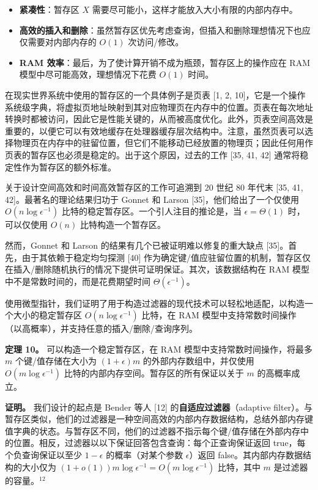 \documentclass[12pt,a4paper]{ctexart}
\theoremstyle{remark}
\begin{document}
\begin{itemize}
\item \textbf{紧凑性}：暂存区 $X$ 需要尽可能小，这样才能放入大小有限的内部内存中。
\item \textbf{高效的插入和删除}：虽然暂存区优先考虑查询，但插入和删除理想情况下也应仅需要对内部内存的 $O(1)$ 次访问/修改。
\item \textbf{RAM 效率}：最后，为了使计算开销不成为瓶颈，暂存区上的操作应在 RAM 模型中尽可能高效，理想情况下花费 $O(1)$ 时间。
\end{itemize}

在现实世界系统中使用的暂存区的一个具体例子是页表 [1, 2, 10]，它是一个操作系统级字典，将虚拟页地址映射到其对应物理页在内存中的位置。页表在每次地址转换时都被访问，因此它是性能关键的，从而被高度优化。此外，页表空间高效是重要的，以便它可以有效地缓存在处理器缓存层次结构中。注意，虽然页表可以选择物理页在内存中的驻留位置，但它们不能移动已经放置的物理页；因此任何用作页表的暂存区也必须是稳定的。出于这个原因，过去的工作 [35, 41, 42] 通常将稳定性作为暂存区的额外标准。

关于设计空间高效和时间高效暂存区的工作可追溯到 20 世纪 80 年代末 [35, 41, 42]。最著名的理论结果归功于 Gonnet 和 Larson [35]，他们给出了一个仅使用 $O(n\log\epsilon^{-1})$ 比特的稳定暂存区。一个引人注目的推论是，当 $\epsilon=\Theta(1)$ 时，可以仅使用 $O(n)$ 比特构造一个暂存区。

然而，Gonnet 和 Larson 的结果有几个已被证明难以修复的重大缺点 [35]。首先，由于其依赖于稳定均匀探测 [40] 作为确定键/值应驻留位置的机制，暂存区仅在插入/删除随机执行的情况下提供可证明保证。其次，该数据结构在 RAM 模型中不是常数时间的，而是花费期望时间 $\Theta(\epsilon^{-1})$。

使用微型指针，我们证明了用于构造过滤器的现代技术可以轻松地适配，以构造一个大小的稳定暂存区 $O(n\log\epsilon^{-1})$ 比特，在 RAM 模型中支持常数时间操作（以高概率），并支持任意的插入/删除/查询序列。

\textbf{定理 10。} 可以构造一个稳定暂存区，在 RAM 模型中支持常数时间操作，将最多 $m$ 个键/值存储在大小为 $(1+\epsilon)m$ 的外部内存数组中，并仅使用 $O(m\log\epsilon^{-1})$ 比特的内部内存空间。暂存区的所有保证以关于 $m$ 的高概率成立。

\textbf{证明。} 我们设计的起点是 Bender 等人 [12] 的\textbf{自适应过滤器}（adaptive filter）。与暂存区类似，他们的过滤器是一种空间高效的内部内存数据结构，总结外部内存键值字典的状态。与暂存区不同，他们的过滤器不指示每个键/值存储在外部内存中的位置。相反，过滤器以以下保证回答包含查询：每个正查询保证返回 true，每个负查询保证以至少 $1-\epsilon$ 的概率（对某个参数 $\epsilon$）返回 false。其内部内存数据结构的大小仅为 $(1+o(1))m\log\epsilon^{-1}=O(m\log\epsilon^{-1})$ 比特，其中 $m$ 是过滤器的容量。$^{12}$
\end{document}
